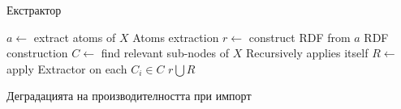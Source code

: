 \documentclass[bulgarian]{beamer}
\begin{document}
\begin{frame}{Екстрактор}

\begin{algorithmic}[1]
\State $a \leftarrow$ extract atoms of $X$
\Comment Atoms extraction
\State $r \leftarrow$ construct RDF from $a$
\Comment RDF construction
\State $C \leftarrow$ find relevant sub-nodes of $X$
\Comment Recursively applies itself
\State $R \leftarrow$ apply Extractor on each $C_i \in C$
\State \Return $r \bigcup R$
\EndProcedure
\end{algorithmic}
\label{algo:extractor}

\end{frame}


\begin{frame}{Деградацията на производителността при импорт}
\centering
{}
\end{frame}
\end{document}
